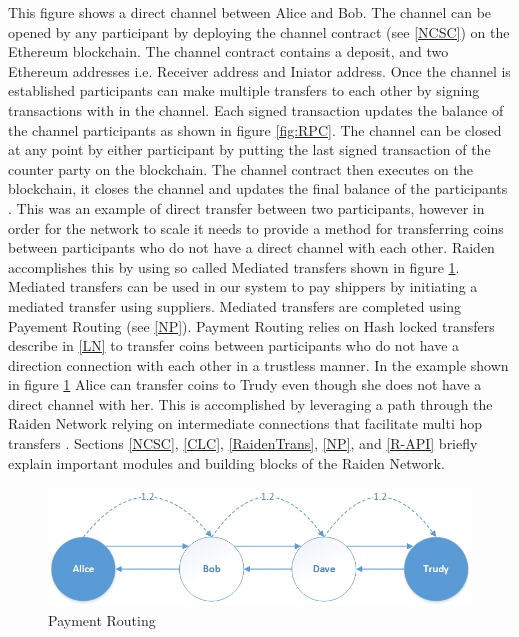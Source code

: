 This figure shows a direct channel between Alice and Bob. The channel can be opened by any participant by deploying the channel contract (see \ref{NCSC}) on the Ethereum blockchain. The channel contract contains a deposit, and two Ethereum addresses i.e. Receiver address and Iniator address. Once the channel is established participants can make multiple transfers to each other by signing transactions with in the channel. Each signed transaction updates the balance of the channel participants as shown in figure \ref{fig:RPC}. The channel can be closed at any point by either participant by putting the last signed transaction of the counter party on the blockchain. The channel contract then executes on the blockchain, it closes the channel and updates the final balance of the participants \cite{rad:001}. This was an example of direct transfer between two participants, however in order for the network to scale it needs to provide a method for transferring coins between participants who do not have a direct channel with each other. Raiden accomplishes this by using so called Mediated transfers shown in figure \ref{fig:PaymentRouting}. Mediated transfers can be used in our system to pay shippers by initiating a mediated transfer using suppliers. Mediated transfers are completed using Payement Routing (see \ref{NP}). Payment Routing relies on Hash locked transfers describe in \ref{LN} to transfer coins between participants who do not have a direction connection with each other in a trustless manner. In the example shown in figure \ref{fig:PaymentRouting} Alice can transfer coins to Trudy even though she does not have a direct channel with her. This is accomplished by leveraging a path through the Raiden Network relying on intermediate connections that facilitate multi hop transfers \cite{rad:001}.  Sections \ref{NCSC}, \ref{CLC}, \ref{RaidenTrans}, \ref{NP}, and \ref{R-API} briefly explain important modules and building blocks of the Raiden Network.

\begin{figure}[h]
	\centering
    \includegraphics[width=120mm,scale=1]{figs/PaymentRouting}
	\caption{Payment Routing}
	\label{fig:PaymentRouting}
\end{figure}
\vspace{0.5cm}
